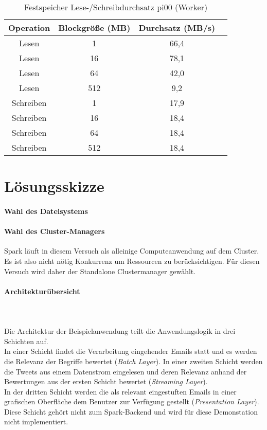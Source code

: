 \begin{table}[ht]
	\centering %
	\begin{tabular}{c c c c} %
	\hline\hline %
	Operation & Blockgröße (MB) & Durchsatz (MB/s) \\ [0.5ex] %
	\hline %
	Lesen & 1 & 66,4 \\ 
	Lesen & 16 & 78,1 \\
	Lesen & 64 & 42,0 \\
	Lesen & 512 & 9,2 \\
	Schreiben & 1 & 17,9 \\ 
	Schreiben & 16 & 18,4 \\
	Schreiben & 64 & 18,4 \\
	Schreiben & 512 & 18,4 \\[1ex] 
	\hline %
	\end{tabular}
	\caption{Festspeicher Lese-/Schreibdurchsatz pi00 (Worker)} %
	\label{table:worker_harddrive} %
\end{table}

\section{Lösungsskizze}
\paragraph{Wahl des Dateisystems}



\paragraph{Wahl des Cluster-Managers}

Spark läuft in diesem Versuch als alleinige Computeanwendung auf dem Cluster. Es ist also nicht nötig Konkurrenz um Ressourcen zu berücksichtigen. Für diesen Versuch wird daher der Standalone Clustermanager gewählt.\\

\paragraph{Architekturübersicht}\\
\\

Die Architektur der Beispielanwendung teilt die Anwendungslogik in drei Schichten auf. \\
In einer Schicht findet die Verarbeitung eingehender Emails statt und es werden die Relevanz der Begriffe bewertet (\textit{Batch Layer}).
In einer zweiten Schicht werden die Tweets aus einem Datenstrom eingelesen und deren Relevanz anhand der Bewertungen aus der ersten Schicht bewertet (\textit{Streaming Layer}).\\
In der dritten Schicht werden die als relevant eingestuften Emails in einer grafischen Oberfläche dem Benutzer zur Verfügung gestellt (\textit{Presentation Layer}). Diese Schicht gehört nicht zum Spark-Backend und wird für diese Demonstation nicht implementiert.

